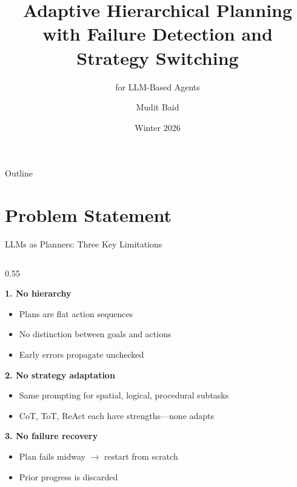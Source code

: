 \documentclass[aspectratio=169]{beamer}
\title{Adaptive Hierarchical Planning with Failure Detection and Strategy Switching}
\subtitle{for LLM-Based Agents}
\author{Mudit Baid}
\institute{Stanford University \\ CS 372}
\date{Winter 2026}
\begin{document}
\begin{frame}
\titlepage
\end{frame}

\begin{frame}{Outline}
\tableofcontents
\end{frame}

\section{Problem Statement}

\begin{frame}{LLMs as Planners: Three Key Limitations}

\begin{columns}[T]
\begin{column}{0.55\textwidth}

\textbf{1. No hierarchy}
\begin{itemize}
    \item Plans are flat action sequences
    \item No distinction between goals and actions
    \item Early errors propagate unchecked
\end{itemize}

\vspace{0.3cm}
\textbf{2. No strategy adaptation}
\begin{itemize}
    \item Same prompting for spatial, logical, procedural subtasks
    \item CoT, ToT, ReAct each have strengths---none adapts
\end{itemize}

\vspace{0.3cm}
\textbf{3. No failure recovery}
\begin{itemize}
    \item Plan fails midway $\rightarrow$ restart from scratch
    \item Prior progress is discarded
\end{itemize}
\end{column}


\end{columns}
\end{frame}
\end{document}
